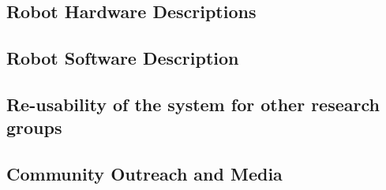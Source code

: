 \documentclass[runningheads,a4paper]{llncs}
\begin{document}
\subsection{Robot Hardware Descriptions}


\subsection{Robot Software Description}


\subsection{Re-usability of the system for other research groups}


\subsection{Community Outreach and Media}




\end{document}
